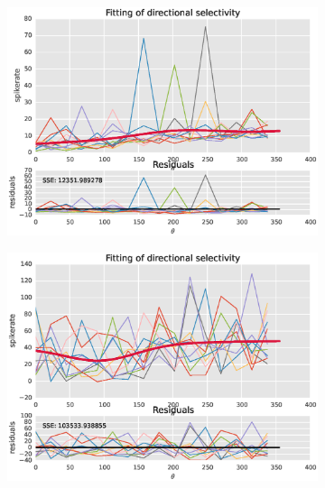 \documentclass[11pt]{article}
\begin{document}
\begin{figure}
    \centering
    \begin{subfigure}{.48\textwidth}
        \centering
        \includegraphics[width=\linewidth]{plots/fit_unsel1}
    \end{subfigure}
    \begin{subfigure}{.48\textwidth}
        \centering
        \includegraphics[width=\linewidth]{plots/fit_unsel2}
    \end{subfigure}
    \newline
    \begin{subfigure}{.48\textwidth}
        \centering

\end{subfigure}
\end{figure}
\end{document}
